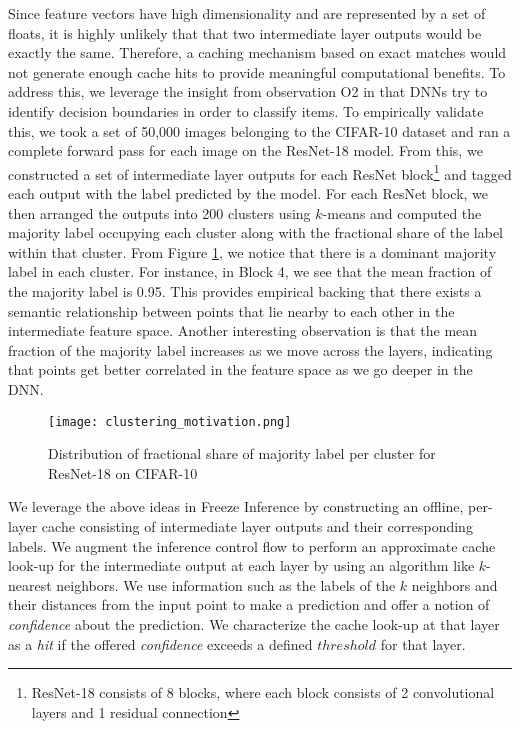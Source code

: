 \documentclass[letterpaper,twocolumn,10pt]{article}
\begin{document}
Since feature vectors have high dimensionality and are represented by a set of floats, it is highly unlikely that that two intermediate layer outputs would be exactly the same. Therefore, a caching mechanism based on exact matches would not generate enough cache hits to provide meaningful computational benefits. To address this, we leverage the insight from observation O2 in that DNNs try to identify decision boundaries in order to classify items. To empirically validate this, we took a set of 50,000 images belonging to the CIFAR-10\cite{cifar_10} dataset and ran a complete forward pass for each image on the ResNet-18\cite{Resnet} model. From this, we constructed a set of intermediate layer outputs for each ResNet block\footnote{ResNet-18 consists of 8 blocks, where each block consists of 2 convolutional layers and 1 residual connection} and tagged each output with the label predicted by the model. For each ResNet block, we then arranged the outputs into 200 clusters using $k$-means and computed the majority label occupying each cluster along with the fractional share of the label within that cluster. From Figure \ref{fig:clustering}, we notice that there is a dominant majority label in each cluster. For instance, in Block 4, we see that the mean fraction of the majority label is 0.95. This provides empirical backing that there exists a semantic relationship between points that lie nearby to each other in the intermediate feature space. Another interesting observation is that the mean fraction of the majority label increases as we move across the layers, indicating that points get better correlated in the feature space as we go deeper in the DNN.


\begin{figure}[t!]
  \centering
    \texttt{[image: clustering\_motivation.png]}
    \vspace{-10pt}
    \caption{Distribution of fractional share of majority label per cluster for ResNet-18 on CIFAR-10}
    \label{fig:clustering}
\end{figure}

We leverage the above ideas in Freeze Inference by constructing an offline, per-layer cache consisting of intermediate layer outputs and their corresponding labels. We augment the inference control flow to perform an approximate cache look-up for the intermediate output at each layer by using an algorithm like $k$-nearest neighbors. We use information such as the labels of the $k$ neighbors and their distances from the input point to make a prediction and offer a notion of {\it confidence} about the prediction. We characterize the cache look-up at that layer as a {\it hit} if the offered {\it confidence} exceeds a defined $threshold$ for that layer. 
\end{document}
